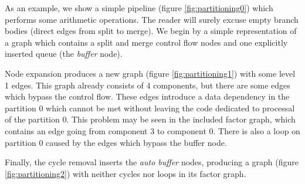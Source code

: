 As an example, we show a simple pipeline (figure \ref{fig:partitioning0}) which performs some arithmetic operations. The reader will surely excuse empty branch bodies (direct edges from split to merge). We begin by a simple representation of a graph which contains a split and merge control flow nodes and one explicitly inserted queue (the \emph{buffer} node).

Node expansion produces a new graph (figure \ref{fig:partitioning1}) with some level 1 edges. This graph already consists of 4 components, but there are some edges which bypass the control flow. These edges introduce a data dependency in the partition 0 which cannot be met without leaving the code dedicated to processal of the partition 0. This problem may be seen in the included factor graph, which contains an edge going from component 3 to component 0. There is also a loop on partition 0 caused by the edges which bypass the buffer node. 

Finally, the cycle removal inserts the \emph{auto buffer} nodes, producing a graph (figure \ref{fig:partitioning2}) with neither cycles nor loops in its factor graph.


